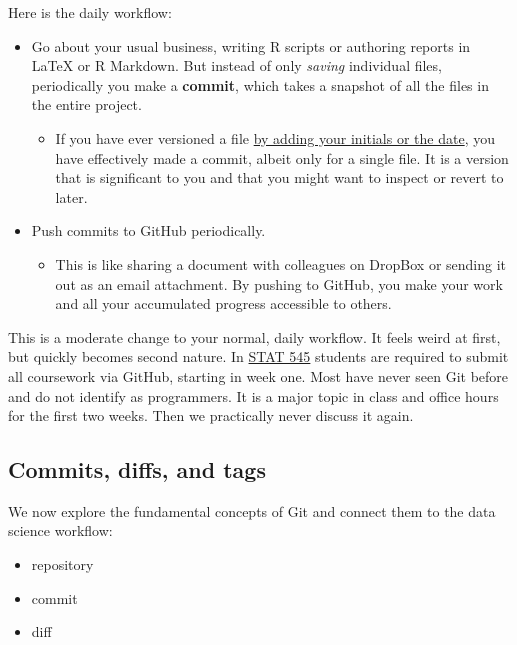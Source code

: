 \documentclass[12pt]{article}
\providecommand{\tightlist}{%
  \setlength{\itemsep}{0pt}\setlength{\parskip}{0pt}}
\begin{document}
Here is the daily workflow:

\begin{itemize}
\tightlist
\item
  Go about your usual business, writing R scripts or authoring reports
  in LaTeX or R Markdown. But instead of only \emph{saving} individual
  files, periodically you make a \textbf{commit}, which takes a snapshot
  of all the files in the entire project.

  \begin{itemize}
  \tightlist
  \item
    If you have ever versioned a file
    \href{http://www.phdcomics.com/comics/archive.php?comicid=1531}{by
    adding your initials or the date}, you have effectively made a
    commit, albeit only for a single file. It is a version that is
    significant to you and that you might want to inspect or revert to
    later.
  \end{itemize}
\item
  Push commits to GitHub periodically.

  \begin{itemize}
  \tightlist
  \item
    This is like sharing a document with colleagues on DropBox or
    sending it out as an email attachment. By pushing to GitHub, you
    make your work and all your accumulated progress accessible to
    others.
  \end{itemize}
\end{itemize}

This is a moderate change to your normal, daily workflow. It feels weird
at first, but quickly becomes second nature. In
\href{http://stat545.com}{STAT 545} students are required to submit all
coursework via GitHub, starting in week one. Most have never seen Git
before and do not identify as programmers. It is a major topic in class
and office hours for the first two weeks. Then we practically never
discuss it again.

\subsection{Commits, diffs, and tags}\label{commits-diffs-and-tags}

We now explore the fundamental concepts of Git and connect them to the
data science workflow:

\begin{itemize}
\tightlist
\item
  repository
\item
  commit
\item
  diff
\end{itemize}
\end{document}
